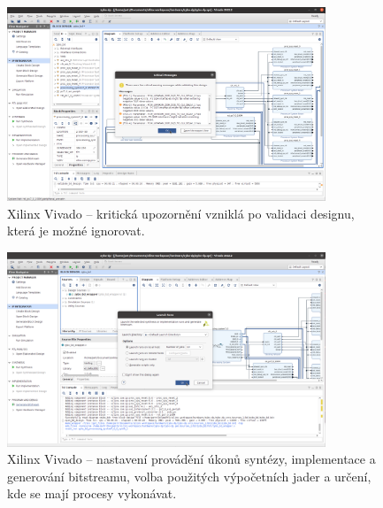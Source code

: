 \documentclass[a4paper, twoside, 11pt]{article}
\begin{document}
		\begin{figure}[htbp!]
			\centering
			\includegraphics[width=0.85\textwidth]{src/png/xilinx-vivado-flow/xilinx-vivado-flow-24.png}
			\caption{Xilinx Vivado – kritická upozornění vzniklá po validaci designu, která je možné ignorovat.}
			\label{fig:xilinx-vivado-flow-24}
		\end{figure}


		\begin{figure}[htbp!]
			\centering
			\includegraphics[width=0.85\textwidth]{src/png/xilinx-vivado-flow/xilinx-vivado-flow-29.png}
			\caption{Xilinx Vivado – nastavení provádění úkonů syntézy, implementace a generování bitstreamu, volba použitých výpočetních jader a určení, kde se mají procesy vykonávat.}
			\label{fig:xilinx-vivado-flow-29}
		\end{figure}
\end{document}
